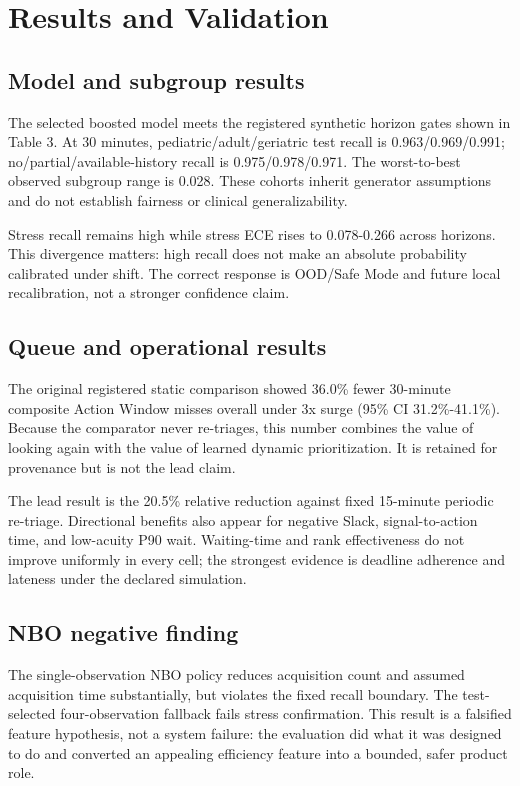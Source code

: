 \documentclass[11pt,a4paper]{article}
\begin{document}
\section{Results and Validation}

\subsection{Model and subgroup results}

The selected boosted model meets the registered synthetic horizon gates shown in Table 3. At 30 minutes, pediatric/adult/geriatric test recall is 0.963/0.969/0.991; no/partial/available-history recall is 0.975/0.978/0.971. The worst-to-best observed subgroup range is 0.028. These cohorts inherit generator assumptions and do not establish fairness or clinical generalizability.

Stress recall remains high while stress ECE rises to 0.078-0.266 across horizons. This divergence matters: high recall does not make an absolute probability calibrated under shift. The correct response is OOD/Safe Mode and future local recalibration, not a stronger confidence claim.

\subsection{Queue and operational results}

The original registered static comparison showed 36.0\% fewer 30-minute composite Action Window misses overall under 3x surge (95\% CI 31.2\%-41.1\%). Because the comparator never re-triages, this number combines the value of looking again with the value of learned dynamic prioritization. It is retained for provenance but is not the lead claim.

The lead result is the 20.5\% relative reduction against fixed 15-minute periodic re-triage. Directional benefits also appear for negative Slack, signal-to-action time, and low-acuity P90 wait. Waiting-time and rank effectiveness do not improve uniformly in every cell; the strongest evidence is deadline adherence and lateness under the declared simulation.

\subsection{NBO negative finding}

The single-observation NBO policy reduces acquisition count and assumed acquisition time substantially, but violates the fixed recall boundary. The test-selected four-observation fallback fails stress confirmation. This result is a falsified feature hypothesis, not a system failure: the evaluation did what it was designed to do and converted an appealing efficiency feature into a bounded, safer product role.
\end{document}

